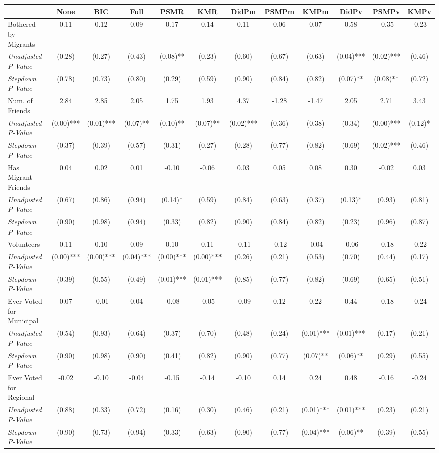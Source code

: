 \begin{tabular}{l c c c c c c c c c c c}
\toprule
 & None & BIC & Full & PSMR & KMR & DidPm & PSMPm & KMPm & DidPv & PSMPv & KMPv \\
\midrule
Bothered by Migrants & 0.11 & 0.12 & 0.09 & 0.17 & 0.14 & 0.11 & 0.06 & 0.07 & 0.58 & -0.35 & -0.23 \\
\quad \textit{Unadjusted P-Value} & (0.28) & (0.27) & (0.43) & (0.08)** & (0.23) & (0.60) & (0.67) & (0.63) & (0.04)*** & (0.02)*** & (0.46) \\
\quad \textit{Stepdown P-Value} & (0.78) & (0.73) & (0.80) & (0.29) & (0.59) & (0.90) & (0.84) & (0.82) & (0.07)** & (0.08)** & (0.72) \\
Num. of Friends & 2.84 & 2.85 & 2.05 & 1.75 & 1.93 & 4.37 & -1.28 & -1.47 & 2.05 & 2.71 & 3.43 \\
\quad \textit{Unadjusted P-Value} & (0.00)*** & (0.01)*** & (0.07)** & (0.10)** & (0.07)** & (0.02)*** & (0.36) & (0.38) & (0.34) & (0.00)*** & (0.12)* \\
\quad \textit{Stepdown P-Value} & (0.37) & (0.39) & (0.57) & (0.31) & (0.27) & (0.28) & (0.77) & (0.82) & (0.69) & (0.02)*** & (0.46) \\
Has Migrant Friends & 0.04 & 0.02 & 0.01 & -0.10 & -0.06 & 0.03 & 0.05 & 0.08 & 0.30 & -0.02 & 0.03 \\
\quad \textit{Unadjusted P-Value} & (0.67) & (0.86) & (0.94) & (0.14)* & (0.59) & (0.84) & (0.63) & (0.37) & (0.13)* & (0.93) & (0.81) \\
\quad \textit{Stepdown P-Value} & (0.90) & (0.98) & (0.94) & (0.33) & (0.82) & (0.90) & (0.84) & (0.82) & (0.23) & (0.96) & (0.87) \\
Volunteers & 0.11 & 0.10 & 0.09 & 0.10 & 0.11 & -0.11 & -0.12 & -0.04 & -0.06 & -0.18 & -0.22 \\
\quad \textit{Unadjusted P-Value} & (0.00)*** & (0.00)*** & (0.04)*** & (0.00)*** & (0.00)*** & (0.26) & (0.21) & (0.53) & (0.70) & (0.44) & (0.17) \\
\quad \textit{Stepdown P-Value} & (0.39) & (0.55) & (0.49) & (0.01)*** & (0.01)*** & (0.85) & (0.77) & (0.82) & (0.69) & (0.65) & (0.51) \\
Ever Voted for Municipal & 0.07 & -0.01 & 0.04 & -0.08 & -0.05 & -0.09 & 0.12 & 0.22 & 0.44 & -0.18 & -0.24 \\
\quad \textit{Unadjusted P-Value} & (0.54) & (0.93) & (0.64) & (0.37) & (0.70) & (0.48) & (0.24) & (0.01)*** & (0.01)*** & (0.17) & (0.21) \\
\quad \textit{Stepdown P-Value} & (0.90) & (0.98) & (0.90) & (0.41) & (0.82) & (0.90) & (0.77) & (0.07)** & (0.06)** & (0.29) & (0.55) \\
Ever Voted for Regional & -0.02 & -0.10 & -0.04 & -0.15 & -0.14 & -0.10 & 0.14 & 0.24 & 0.48 & -0.16 & -0.24 \\
\quad \textit{Unadjusted P-Value} & (0.88) & (0.33) & (0.72) & (0.16) & (0.30) & (0.46) & (0.21) & (0.01)*** & (0.01)*** & (0.23) & (0.21) \\
\quad \textit{Stepdown P-Value} & (0.90) & (0.73) & (0.94) & (0.33) & (0.63) & (0.90) & (0.77) & (0.04)*** & (0.06)** & (0.39) & (0.55) \\
\bottomrule
\end{tabular}
